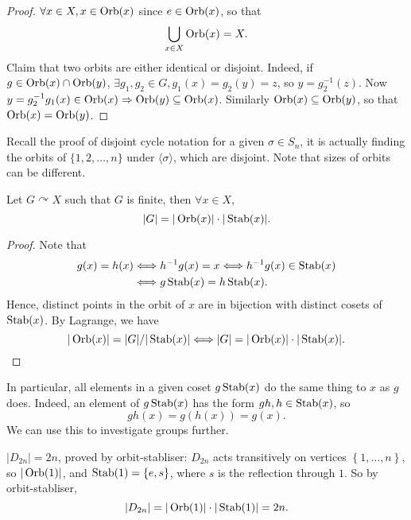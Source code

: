 \documentclass[a4paper]{article}
\newcommand{\bluecomment}[1]{{\color{blue}#1}}
\begin{document}
        \begin{proof}
            $ \forall x\in X, x\in \operatorname{Orb}(x) $ since $e\in\operatorname{Orb}(x)$, so that 
            \[
                \bigcup_{x\in X}\operatorname{Orb}(x)=X
            .\]
            Claim that two orbits are either identical or disjoint. Indeed, if $ g\in \operatorname{Orb}(x)\cap \operatorname{Orb}(y) $, $ \exists g_1,g_2\in G, g_1(x)=g_2(y)=z $, so $ y=g_2^{-1}(z) $. Now $ y=g_2^{-1}g_1(x)\in \operatorname{Orb}(x) \Rightarrow \operatorname{Orb}(y)\subseteq \operatorname{Orb}(x) $. Similarly $ \operatorname{Orb}(x) \subseteq \operatorname{Orb}(y) $, so that $ \operatorname{Orb}(x)=\operatorname{Orb}(y) $.
        \end{proof}
        \begin{remark}
            Recall the proof of disjoint cycle notation for a given $ \sigma\in S_n $, it is actually finding the orbits of $ \{1,2,\dots,n\} $ under $ \langle \sigma \rangle  $, which are disjoint. \bluecomment{Note that sizes of orbits can be different.}
        \end{remark}
        \newpage
        \begin{theorem}\label{thm:Orbit-Stabliser Theorem}
            Let $ G \curvearrowright X $ such that $G$ is finite, then $ \forall x\in X $,
            \[
                |G|=|\operatorname{Orb}(x)|\cdot |\operatorname{Stab}(x)|
            .\]
        \end{theorem}
        \begin{proof}
            Note that 
            \[
                \begin{aligned}
                    g(x)=h(x)&\Longleftrightarrow h^{-1}g(x)=x \Longleftrightarrow h^{-1}g(x)\in \operatorname{Stab}(x)\\
                    &\Longleftrightarrow g\operatorname{Stab}(x)=h\operatorname{Stab}(x).
                \end{aligned}
            \]
            Hence, distinct points in the orbit of $x$ are in bijection with distinct cosets of $\operatorname{Stab}(x)$. By Lagrange, we have 
            \[
                |\operatorname{Orb}(x)|=|G|/|\operatorname{Stab}(x)| \Longleftrightarrow |G|=|\operatorname{Orb}(x)|\cdot |\operatorname{Stab}(x)|
            .\]
        \end{proof}
        In particular, all elements in a given coset $ g\operatorname{Stab}(x) $ do the same thing to $x$ as $g$ does. Indeed, an element of $g\operatorname{Stab}(x)$ has the form $ gh,h\in \operatorname{Stab}(x) $, so 
        \[
            gh(x)=g(h(x))=g(x)
        .\]
        We can use this to investigate groups further.
        \begin{example}
            $ |D_{2n}|=2n $, proved by orbit-stabliser: $ D_{2n} $ acts transitively on vertices $ \left\{ 1,\dots,n\right\} $, so $ |\operatorname{Orb}(1)| $, and $ \operatorname{Stab}(1)=\left\{ e,s\right\} $, where $s$ is the reflection through $1$. So by orbit-stabliser,
            \[
                |D_{2n}|=|\operatorname{Orb}(1)|\cdot |\operatorname{Stab}(1)|=2n
            .\]
        \end{example}
\end{document}
